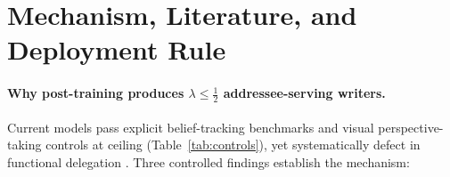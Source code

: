 \documentclass[10.5pt]{article}
\theoremstyle{definition}
\begin{document}
\section{Mechanism, Literature, and Deployment Rule}
\label{sec:discussion}

\paragraph{Why post-training produces $\lambda \le \tfrac{1}{2}$ addressee-serving writers.}
Current models pass explicit belief-tracking benchmarks \citep{le2019tomi,he2023hitom,kim2023fantom,gandhi2023bigtom,sclar2025exploretom,kosinski2024,strachan2024} and visual perspective-taking controls at ceiling (Table~\ref{tab:controls}), yet systematically defect in functional delegation \citep{gu2024simpletom,riemer2025}. Three controlled findings establish the mechanism:
\end{document}
